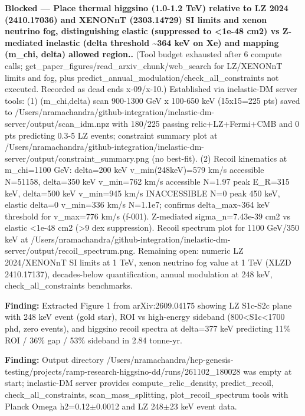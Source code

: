 \documentclass[11pt,a4paper]{article}
\begin{document}
\textbf{Blocked --- Place thermal higgsino (1.0-1.2 TeV) relative to LZ 2024 (2410.17036) and XENONnT (2303.14729) SI limits and xenon neutrino fog, distinguishing elastic (suppressed to \textless{}1e-48 cm2) vs Z-mediated inelastic (delta threshold \textasciitilde{}364 keV on Xe) and mapping (m\_chi, delta) allowed region..} (Tool budget exhausted after 6 compute calls; get\_paper\_figures/read\_arxiv\_chunk/web\_search for LZ/XENONnT limits and fog, plus predict\_annual\_modulation/check\_all\_constraints not executed. Recorded as dead ends x-09/x-10.) Established via inelastic-DM server tools: (1) (m\_chi,delta) scan 900-1300 GeV x 100-650 keV (15x15=225 pts) saved to /Users/nramachandra/github-integration/inelastic-dm-server/output/scan\_idm.npz with 180/225 passing relic+LZ+Fermi+CMB and 0 pts predicting 0.3-5 LZ events; constraint summary plot at /Users/nramachandra/github-integration/inelastic-dm-server/output/constraint\_summary.png (no best-fit). (2) Recoil kinematics at m\_chi=1100 GeV: delta=200 keV v\_min(248keV)=579 km/s accessible N=51158, delta=350 keV v\_min=762 km/s accessible N=1.97 peak E\_R=315 keV, delta=500 keV v\_min=945 km/s INACCESSIBLE N=0 peak 450 keV, elastic delta=0 v\_min=336 km/s N=1.1e7; confirms delta\_max\textasciitilde{}364 keV threshold for v\_max=776 km/s (f-001). Z-mediated sigma\_n=7.43e-39 cm2 vs elastic \textless{}1e-48 cm2 (\textgreater{}9 dex suppression). Recoil spectrum plot for 1100 GeV/350 keV at /Users/nramachandra/github-integration/inelastic-dm-server/output/recoil\_spectrum.png. Remaining open: numeric LZ 2024/XENONnT SI limits at 1 TeV, xenon neutrino fog value at 1 TeV (XLZD 2410.17137), decades-below quantification, annual modulation at 248 keV, check\_all\_constraints benchmarks.

\textbf{Finding:} Extracted Figure 1 from arXiv:2609.04175 showing LZ S1c-S2c plane with 248 keV event (gold star), ROI vs high-energy sideband (800\textless{}S1c\textless{}1700 phd, zero events), and higgsino recoil spectra at delta=377 keV predicting 11\% ROI / 36\% gap / 53\% sideband in 2.84 tonne-yr.

\textbf{Finding:} Output directory /Users/nramachandra/hep-genesis-testing/projects/ramp-research-higgsino-dd/runs/261102\_180028 was empty at start; inelastic-DM server provides compute\_relic\_density, predict\_recoil, check\_all\_constraints, scan\_mass\_splitting, plot\_recoil\_spectrum tools with Planck Omega h2=0.12$\pm$0.0012 and LZ 248$\pm$23 keV event data.
\end{document}
